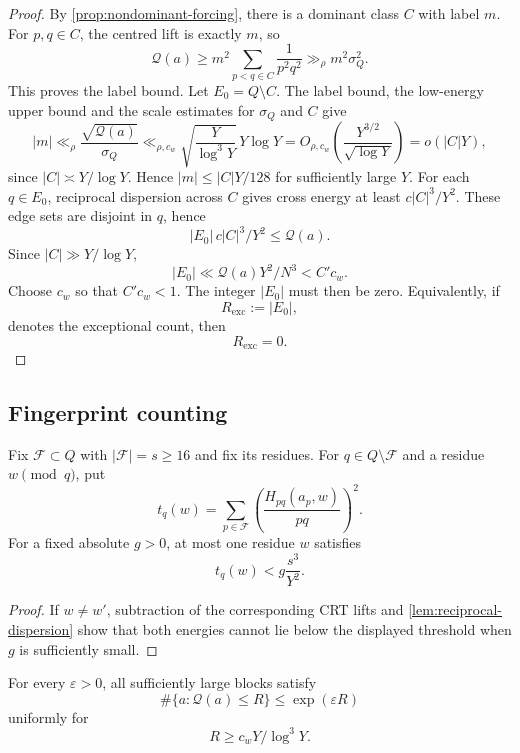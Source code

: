 \begin{proof}
By \cref{prop:nondominant-forcing}, there is a dominant class $C$ with label $m$.  For $p,q\in C$, the centred lift is exactly $m$, so
\[
 \mathcal Q(a)
 \geq m^2\sum_{p<q\in C}\frac1{p^2q^2}
 \gg_\rho m^2\sigma_Q^2.
\]
This proves the label bound.  Let $E_0=Q\setminus C$.  The label bound, the low-energy upper bound and the scale estimates for $\sigma_Q$ and $C$ give
\[
 |m|
 \ll_\rho\frac{\sqrt{\mathcal Q(a)}}{\sigma_Q}
 \ll_{\rho,c_w}\sqrt{\frac{Y}{\log^3Y}}\,Y\log Y
 =O_{\rho,c_w}\!\left(\frac{Y^{3/2}}{\sqrt{\log Y}}\right)
 =o(|C|Y),
\]
since $|C|\asymp Y/\log Y$.  Hence $|m|\leq |C|Y/128$ for sufficiently large $Y$.  For each $q\in E_0$, reciprocal dispersion across $C$ gives cross energy at least $c|C|^3/Y^2$.  These edge sets are disjoint in $q$, hence
\[
 |E_0|\,c|C|^3/Y^2\leq\mathcal Q(a).
\]
Since $|C|\gg Y/\log Y$,
\[
 |E_0|\ll\mathcal Q(a)Y^2/N^3<C'c_w.
\]
Choose $c_w$ so that $C'c_w<1$.  The integer $|E_0|$ must then be zero.  Equivalently, if
\[
 R_{\mathrm{exc}}:=|E_0|,
\]
denotes the exceptional count, then
\[
 R_{\mathrm{exc}}=0.
\]
\end{proof}

\subsection{Fingerprint counting}

\begin{lemma}
\label{lem:fingerprint-rigidity}
Fix $\mathcal F\subset Q$ with $|\mathcal F|=s\geq16$ and fix its residues.  For $q\in Q\setminus\mathcal F$ and a residue $w\pmod q$, put
\[
 t_q(w)=\sum_{p\in\mathcal F}
 \left(\frac{H_{pq}(a_p,w)}{pq}\right)^2.
\]
For a fixed absolute $g>0$, at most one residue $w$ satisfies
\[
 t_q(w)<g\frac{s^3}{Y^2}.
\]
\end{lemma}

\begin{proof}
If $w\neq w'$, subtraction of the corresponding CRT lifts and \cref{lem:reciprocal-dispersion} show that both energies cannot lie below the displayed threshold when $g$ is sufficiently small.
\end{proof}

\begin{proposition}
\label{prop:fingerprint-entropy}
For every $\varepsilon>0$, all sufficiently large blocks satisfy
\[
 \#\{a:\mathcal Q(a)\leq R\}\leq\exp(\varepsilon R)
\]
uniformly for
\[
 R\geq c_wY/\log^3Y.
\]
\end{proposition}

